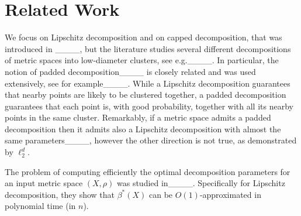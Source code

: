 \section{Related Work}
\label{sec:related}

%
We focus on Lipschitz decomposition and on capped decomposition,
that was introduced in ____, 
but the literature studies several different decompositions of metric spaces
into low-diameter clusters, see e.g.____.
In particular, the notion of padded decomposition____
is closely related and was used extensively,
see for example____.
%
While a Lipschitz decomposition guarantees that nearby points are likely to be clustered together,
a padded decomposition guarantees that each point is, with good probability,
together with all its nearby points in the same cluster.
%
Remarkably, if a metric space admits a padded decomposition then it admits
also a Lipschitz decomposition with almost the same parameters____,
however the other direction is not true, as demonstrated by $\ell_2^d$.
%


%
The problem of computing efficiently the optimal decomposition parameters
for an input metric space $(X,\rho)$ was studied in____.
Specifically for Lipschitz decomposition, %
they show that $\beta^*(X)$ can be $O(1)$-approximated in polynomial time (in $n$).